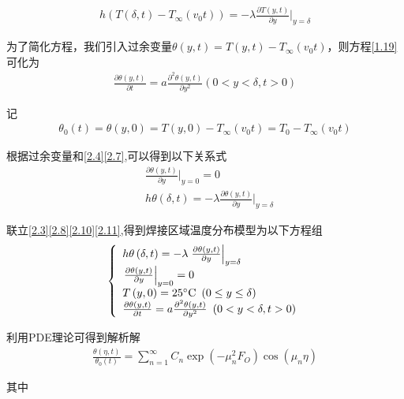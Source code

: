 \documentclass[../main.tex]{subfiles}
\begin{document}
    \begin{align}\label{2.7}
    h(T(\delta,t) - T_{\infty}(v_0t)) = -\lambda\frac{\partial T(y,t)}{\partial y}\Big|_{y= \delta}  
    \end{align}
    \par 为了简化方程，我们引入过余变量$\theta(y,t)=T(y,t)-T_{\infty}(v_0t)$，则方程\eqref{1.19}可化为
    \begin{align}\label{2.8}
    \frac{\partial \theta(y,t)}{\partial t}=a\frac{\partial ^2\theta(y,t)}{\partial y^2}(0<y<\delta,t>0)
     \end{align}
    \par 记
    \begin{align}\label{2.9}
    \theta_0(t)=\theta(y,0)=T(y,0)-T_{\infty}(v_0t)=T_0-T_{\infty}(v_0t)
    \end{align}
    \par 根据过余变量和\eqref{2.4}\eqref{2.7},可以得到以下关系式
    \begin{align}
    &\frac{\partial \theta(y,t)}{\partial y}\Big|_{y = 0}=0     \label{2.10}\\
    &h\theta(\delta,t)=-\lambda\frac{\partial \theta(y,t)}{\partial y}\Big|_{y = \delta}   \label{2.11}
    \end{align}
    \par 联立\eqref{2.3}\eqref{2.8}\eqref{2.10}\eqref{2.11},得到焊接区域温度分布模型为以下方程组
    \begin{align}\label{2.12}
    \left\{\begin{array}{l}
    h\theta \left( \delta ,t \right) =-\lambda \left. \frac{\partial \theta \left( y,t \right)}{\partial y} \right|_{y=\delta}\\
    \left. \frac{\partial \theta \left( y,t \right)}{\partial y} \right|_{y=0}=0\\
    T\left( y,0 \right) =25^{\circ}\text{C\,\,}\left( 0\leq y\leq \delta \right)\\
    \frac{\partial \theta \left( y,t \right)}{\partial t}=a\frac{\partial ^2\theta \left( y,t \right)}{\partial y^2}\,\,\left( 0<y<\delta ,t>0 \right)\\
    \end{array} \right. 
    \end{align}
    \par 利用PDE理论可得到解析解
    \begin{align}\label{2.20}
    \frac{\theta(\eta,t)}{\theta_0(t)}=\sum_{n = 1}^{\infty}{C_n\exp(-\mu_{n}^{2}F_O)\cos(\mu_n\eta)}
    \end{align}
    \par 其中
\end{document}
